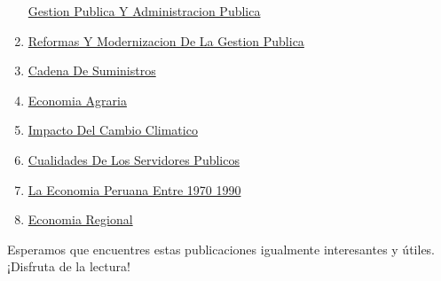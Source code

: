 \documentclass[
  stu,
  floatsintext,
  longtable,
  a4paper,
  nolmodern,
  notxfonts,
  notimes,
  colorlinks=true,linkcolor=blue,citecolor=blue,urlcolor=blue]{apa7}
\begin{document}
\begin{enumerate}
  \href{https://achalmaedison.netlify.app/blog/posts/2021-10-01-gestion-publica-y-administracion-publica/index.pdf}{}
  \href{https://achalmaedison.netlify.app/blog/posts/2021-10-01-gestion-publica-y-administracion-publica}{Gestion
  Publica Y Administracion Publica}
\item
  \href{https://achalmaedison.netlify.app/blog/posts/2021-10-01-reformas-y-modernizacion-de-la-gestion-publica/index.pdf}{}
  \href{https://achalmaedison.netlify.app/blog/posts/2021-10-01-reformas-y-modernizacion-de-la-gestion-publica}{Reformas
  Y Modernizacion De La Gestion Publica}
\item
  \href{https://achalmaedison.netlify.app/blog/posts/2022-01-23-cadena\%20de\%20suministros/index.pdf}{}
  \href{https://achalmaedison.netlify.app/blog/posts/2022-01-23-cadena\%20de\%20suministros}{Cadena
  De Suministros}
\item
  \href{https://achalmaedison.netlify.app/blog/posts/2022-04-22-economia-agraria/index.pdf}{}
  \href{https://achalmaedison.netlify.app/blog/posts/2022-04-22-economia-agraria}{Economia
  Agraria}
\item
  \href{https://achalmaedison.netlify.app/blog/posts/2022-06-02-impacto-del-cambio-climatico/index.pdf}{}
  \href{https://achalmaedison.netlify.app/blog/posts/2022-06-02-impacto-del-cambio-climatico}{Impacto
  Del Cambio Climatico}
\item
  \href{https://achalmaedison.netlify.app/blog/posts/2023-05-11-cualidades-de-los-servidores-publicos/index.pdf}{}
  \href{https://achalmaedison.netlify.app/blog/posts/2023-05-11-cualidades-de-los-servidores-publicos}{Cualidades
  De Los Servidores Publicos}
\item
  \href{https://achalmaedison.netlify.app/blog/posts/2023-05-12-la-economia-peruana-entre-1970-1990/index.pdf}{}
  \href{https://achalmaedison.netlify.app/blog/posts/2023-05-12-la-economia-peruana-entre-1970-1990}{La
  Economia Peruana Entre 1970 1990}
\item
  \href{https://achalmaedison.netlify.app/blog/posts/2023-05-16-economia-regional/index.pdf}{}
  \href{https://achalmaedison.netlify.app/blog/posts/2023-05-16-economia-regional}{Economia
  Regional}
\end{enumerate}

Esperamos que encuentres estas publicaciones igualmente interesantes y
útiles. ¡Disfruta de la lectura!
\end{document}

